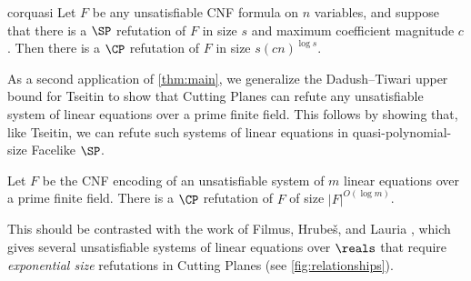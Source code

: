 \begin{restatable}{cor}{quasi}
	\label{cor:quasipoly-simulation}
	Let $F$ be any unsatisfiable CNF formula on $n$ variables, and suppose that there is a $\SP$ refutation of $F$ in size $s$ and maximum coefficient magnitude $c$. 
	Then there is a $\CP$ refutation of $F$ in size $s(cn)^{\log s}$.
\end{restatable}


As a second application of \autoref{thm:main}, we generalize %
the Dadush--Tiwari  %
%
upper bound for Tseitin to show that Cutting Planes can refute any unsatisfiable system of linear equations over a prime finite field. 
This follows by showing that, like Tseitin, we can refute such systems of linear equations in quasi-polynomial-size Facelike $\SP$.
\begin{theorem}\label{thm:linear-equations}
	Let $F$ be the CNF encoding of an unsatisfiable system of $m$ linear equations over a prime finite field. 
	There is a $\CP$ refutation of $F$ of size $|F|^{O(\log m)}$. 
\end{theorem}

This should be contrasted with the work of Filmus, Hrube\v{s}, and Lauria \cite{FilmusHL16}, which gives several unsatisfiable systems of linear equations over $\reals$ that require \emph{exponential size} refutations in Cutting Planes (see \autoref{fig:relationships}).

